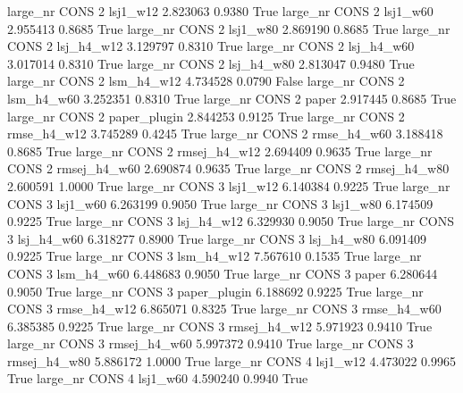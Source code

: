   large_nr     CONS                 2     lsj1_w12    2.823063      0.9380    True
  large_nr     CONS                 2     lsj1_w60    2.955413      0.8685    True
  large_nr     CONS                 2     lsj1_w80    2.869190      0.8685    True
  large_nr     CONS                 2   lsj_h4_w12    3.129797      0.8310    True
  large_nr     CONS                 2   lsj_h4_w60    3.017014      0.8310    True
  large_nr     CONS                 2   lsj_h4_w80    2.813047      0.9480    True
  large_nr     CONS                 2   lsm_h4_w12    4.734528      0.0790   False
  large_nr     CONS                 2   lsm_h4_w60    3.252351      0.8310    True
  large_nr     CONS                 2        paper    2.917445      0.8685    True
  large_nr     CONS                 2 paper_plugin    2.844253      0.9125    True
  large_nr     CONS                 2  rmse_h4_w12    3.745289      0.4245    True
  large_nr     CONS                 2  rmse_h4_w60    3.188418      0.8685    True
  large_nr     CONS                 2 rmsej_h4_w12    2.694409      0.9635    True
  large_nr     CONS                 2 rmsej_h4_w60    2.690874      0.9635    True
  large_nr     CONS                 2 rmsej_h4_w80    2.600591      1.0000    True
  large_nr     CONS                 3     lsj1_w12    6.140384      0.9225    True
  large_nr     CONS                 3     lsj1_w60    6.263199      0.9050    True
  large_nr     CONS                 3     lsj1_w80    6.174509      0.9225    True
  large_nr     CONS                 3   lsj_h4_w12    6.329930      0.9050    True
  large_nr     CONS                 3   lsj_h4_w60    6.318277      0.8900    True
  large_nr     CONS                 3   lsj_h4_w80    6.091409      0.9225    True
  large_nr     CONS                 3   lsm_h4_w12    7.567610      0.1535    True
  large_nr     CONS                 3   lsm_h4_w60    6.448683      0.9050    True
  large_nr     CONS                 3        paper    6.280644      0.9050    True
  large_nr     CONS                 3 paper_plugin    6.188692      0.9225    True
  large_nr     CONS                 3  rmse_h4_w12    6.865071      0.8325    True
  large_nr     CONS                 3  rmse_h4_w60    6.385385      0.9225    True
  large_nr     CONS                 3 rmsej_h4_w12    5.971923      0.9410    True
  large_nr     CONS                 3 rmsej_h4_w60    5.997372      0.9410    True
  large_nr     CONS                 3 rmsej_h4_w80    5.886172      1.0000    True
  large_nr     CONS                 4     lsj1_w12    4.473022      0.9965    True
  large_nr     CONS                 4     lsj1_w60    4.590240      0.9940    True
